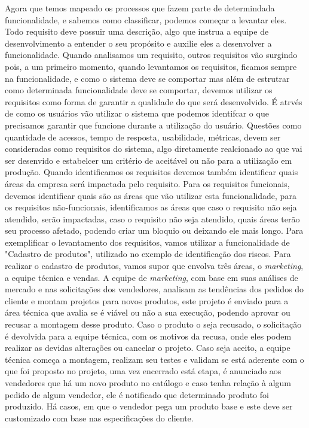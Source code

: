       Agora que temos mapeado os processos que fazem parte de determindada funcionalidade,
      e sabemos como classificar, podemos começar a levantar eles. Todo requisito
      deve possuir uma descrição, algo que instrua a equipe de desenvolvimento a entender
      o seu propósito e auxilie eles a desenvolver a funcionalidade. Quando analisamos
      um requisito, outros requisitos vão surgindo pois, a um primeiro momento,
      quando levantamos os requisitos, ficamos sempre na funcionalidade, e como o
      sistema deve se comportar mas além de estrutrar como determinada funcionalidade
      deve se comportar, devemos utilizar os requisitos como forma de garantir a
      qualidade do que será desenvolvido. É atrvés de como os usuários vão utilizar
      o sistema que podemos identifcar o que precisamos garantir que funcione durante
      a utilização do usuário. Questões como quantidade de acessos, tempo de resposta,
      usabilidade, métricas, devem ser consideradas como requisitos do sistema, algo
      diretamente realcionado ao que vai ser desenvido e estabelcer um critério de
      aceitável ou não para a utilização em produção. Quando identificamos os requisitos
      devemos também identificar quais áreas da empresa será impactada pelo requisito.
      Para os requisitos funcionais, devemos identificar quais são as áreas que vão
      utilizar esta funcionalidade, para os requisitos não-funcionais, identificamos
      as áreas que caso o requisito não seja atendido, serão impactadas, caso o
      requisito não seja atendido, quais áreas terão seu processo afetado, podendo
      criar um bloquio ou deixando ele mais longo. Para exemplificar o levantamento
      dos requisitos, vamos utilizar a funcionalidade de "Cadastro de produtos",
      utilizado no exemplo de identificação dos riscos. \newline
      Para realizar o cadastro de produtos, vamos supor que envolva três áreas, o
      \textit{marketing}, a equipe técnica e vendas. A equipe de \textit{marketing},
      com base em suas análises de mercado e nas solicitações dos vendedores, analisam
      as tendências dos pedidos do cliente e montam projetos para novos produtos,
      este projeto é enviado para a área técnica que avalia se é viável ou não a
      sua execução, podendo aprovar ou recusar a montagem desse produto. Caso o
      produto o seja recusado, o solicitação é devolvida para a equipe técnica,
      com os motivos da recusa, onde eles podem realizar as devidas alterações ou
      cancelar o projeto. Caso seja aceito, a equipe técnica começa a montagem,
      realizam seu testes e validam se está aderente com o que foi proposto no
      projeto, uma vez encerrado está etapa, é anunciado aos vendedores que há um
      novo produto no catálogo e caso tenha relação à algum pedido de algum vendedor,
      ele é notificado que determinado produto foi produzido. Há casos, em que o
      vendedor pega um produto base e este deve ser customizado com base nas
      especificações do cliente. \newline

